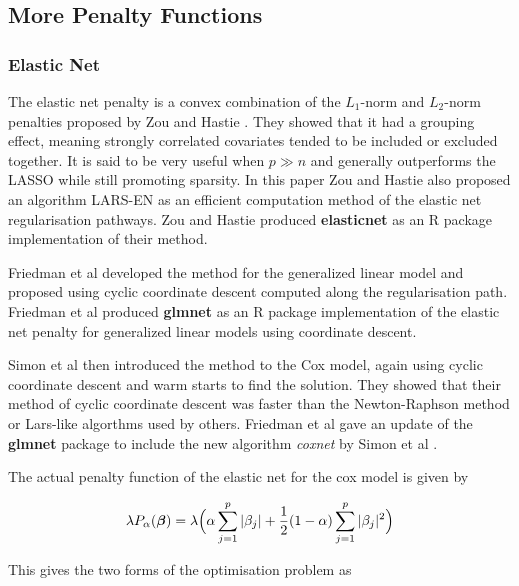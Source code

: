 \subsection{More Penalty Functions}

\subsubsection{Elastic Net}

The elastic net penalty is a convex combination of the $L_1$-norm and $L_2$-norm penalties proposed by Zou and Hastie . They showed that it had a grouping effect, meaning strongly correlated covariates tended to be included or excluded together. It is said to be very useful when $p\gg n$ and generally outperforms the LASSO while still promoting sparsity. In this paper Zou and Hastie  also proposed an algorithm LARS-EN as an efficient computation method of the elastic net regularisation pathways. Zou and Hastie  produced \textbf{elasticnet} as an R package implementation of their method.

Friedman et al  developed the method for the generalized linear model and proposed using cyclic coordinate descent computed along the regularisation path. Friedman et al  produced \textbf{glmnet} as an R package implementation of the elastic net penalty for generalized linear models using coordinate descent.

Simon et al  then introduced the method to the Cox model, again using cyclic coordinate descent and warm starts to find the solution. They showed that their method of cyclic coordinate descent was faster than the Newton-Raphson method or Lars-like algorthms used by others. Friedman et al  gave an update of the \textbf{glmnet} package to include the new algorithm \emph{coxnet} by Simon et al .

The actual penalty function of the elastic net for the cox model is given by

\begin{equation}
    \lambda P_\alpha(\boldsymbol{\beta}) = \lambda\Big(\alpha\sum_{j=1}^p|\beta_j|+\frac{1}{2}(1-\alpha)\sum_{j=1}^p|\beta_j|^2\Big)
\end{equation}

This gives the two forms of the optimisation problem as

